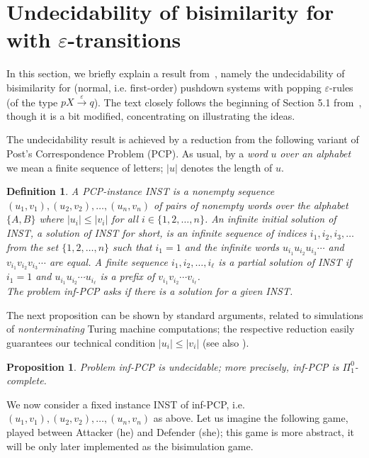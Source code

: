 \documentclass[11pt]{article}
\newtheorem{proposition}[theorem]{Proposition}
\newtheorem{definition}[theorem]{Definition}
\newcommand{\pda}{\text{PDA}\xspace}
\newcommand{\goes}[1]{\ensuremath{\stackrel{#1}{\longrightarrow}}}
\begin{document}
\section{Undecidability of bisimilarity for \pda with
$\varepsilon$-transitions}\label{sec:undecepsilon}

In this section, we briefly explain a result
from~\cite{DBLP:journals/jacm/JancarS08}, namely the undecidability of
bisimilarity for (normal, i.e. first-order) pushdown systems with 
popping $\varepsilon$-rules (of the type $pX\goes{\varepsilon}q$). 
The text closely follows the beginning of Section 5.1
from~\cite{DBLP:journals/jacm/JancarS08}, though it is 
a bit modified, concentrating on illustrating the ideas.


The undecidability result is 
achieved by a reduction from the following variant of
Post's Correspondence Problem (PCP). 
As usual, by a \emph{word} $u$ \emph{over an alphabet} we
mean a finite sequence of letters; $|u|$ denotes the length of $u$.

\begin{definition}
A \emph{PCP-instance} INST
is a nonempty sequence
$(u_1,v_1), (u_2,v_2), \dots, (u_n,v_n)$ of pairs of nonempty words
over the alphabet $\{A,B\}$ where
$|u_i|\leq |v_i|$ for all $i\in\{1,2,\ldots,n\}$.
An \emph{infinite initial solution} of INST, a \emph{solution} of INST for short,
is an infinite sequence of
indices $i_1, i_2, i_3, \ldots$ from the set $\{1,2,\ldots, n\}$
such that $i_1 {=} 1$ and the infinite words
$u_{i_1}u_{i_2}u_{i_3}\cdots$ and
$v_{i_1}v_{i_2}v_{i_3}\cdots$
are equal. A finite sequence $i_1, i_2, \dots, i_{\ell}$ is a
\emph{partial solution} of INST if $i_1 {=} 1$ and
$u_{i_1}u_{i_2}\cdots u_{i_\ell}$
is a prefix of $v_{i_1}v_{i_2}\cdots v_{i_\ell}$.
\\
The problem \emph{inf-PCP} asks if there is 
a solution
for a given INST.
\end{definition}

The next proposition can be shown by standard arguments, related to
simulations of \emph{nonterminating} Turing machine computations;
the respective reduction easily guarantees our 
technical condition $|u_i|\leq |v_i|$ 
(see also \cite{DBLP:journals/jacm/JancarS08}). 


\begin{proposition}
\label{prop:infandrecPCP}
Problem inf-PCP is undecidable; more precisely, 
inf-PCP is $\Pi^0_1$-complete.
\end{proposition}

We now consider
a fixed instance INST of inf-PCP,
i.e. $(u_1,v_1), (u_2,v_2), \dots, (u_n,v_n)$
as above.
Let us imagine the following game, played between Attacker (he)
and  Defender (she); this game is more abstract, it will be only later
implemented as the bisimulation game.
\end{document}
